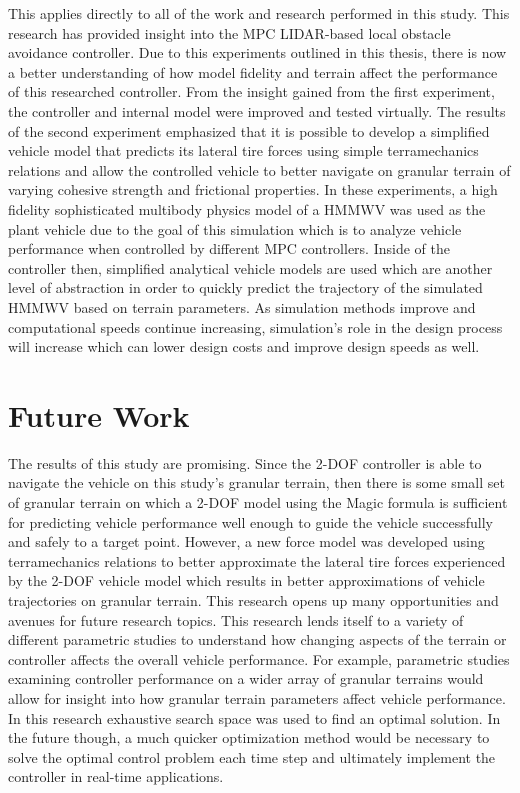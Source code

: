 \documentclass[12pt,onecolumn]{report}
\newcommand{\CHRONO}{{\sffamily{{Chrono}}}}
\begin{document}
This applies directly to all of the work and research performed in this study. This research has provided insight into the MPC LIDAR-based local obstacle avoidance controller. Due to this experiments outlined in this thesis, there is now a better understanding of how model fidelity and terrain affect the performance of this researched controller. From the insight gained from the first experiment, the controller and internal model were improved and tested virtually. The results of the second experiment emphasized that it is possible to develop a simplified vehicle model that predicts its lateral tire forces using simple terramechanics relations and allow the controlled vehicle to better navigate on granular terrain of varying cohesive strength and frictional properties. In these experiments, a high fidelity sophisticated multibody physics model of a HMMWV was used as the plant vehicle due to the goal of this simulation which is to analyze vehicle performance when controlled by different MPC controllers. Inside of the controller then, simplified analytical vehicle models are used which are another level of abstraction in order to quickly predict the trajectory of the simulated HMMWV based on terrain parameters. As simulation methods improve and computational speeds continue increasing, simulation's role in the design process will increase which can lower design costs and improve design speeds as well. 

\section{Future Work}\label{s:FutureWork}

The results of this study are promising. Since the 2-DOF controller is able to navigate the {\CHRONO} vehicle on this study's granular terrain, then there is some small set of granular terrain on which a 2-DOF model using the Magic formula is sufficient for predicting vehicle performance well enough to guide the vehicle successfully and safely to a target point. However, a new force model was developed using terramechanics relations to better approximate the lateral tire forces experienced by the 2-DOF vehicle model which results in better approximations of vehicle trajectories on granular terrain. This research opens up many opportunities and avenues for future research topics. This research lends itself to a variety of different parametric studies to understand how changing aspects of the terrain or controller affects the overall vehicle performance. For example, parametric studies examining controller performance on a wider array of granular terrains would allow for insight into how granular terrain parameters affect vehicle performance. In this research exhaustive search space was used to find an optimal solution. In the future though, a much quicker optimization method would be necessary to solve the optimal control problem each time step and ultimately implement the controller in real-time applications. 
\end{document}
